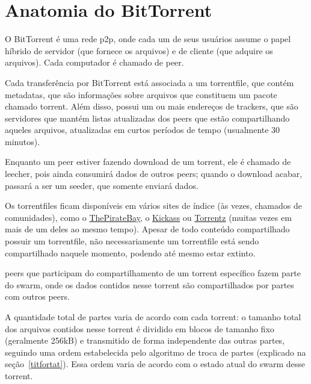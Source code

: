 
\chapter{Anatomia do BitTorrent}

O BitTorrent é uma rede \gls{p2p}, onde cada um de seus usuários assume o papel híbrido
de servidor (que fornece os arquivos) e de cliente (que adquire os arquivos). Cada
computador é chamado de \gls{peer}.

Cada transferência por BitTorrent está associada a um \gls{torrentfile}, que contém
\glspl{metadata}, que são informações sobre arquivos que constituem um pacote chamado
\gls{torrent}. Além disso, possui um ou mais endereços de \glspl{tracker}, que são
servidores que mantém listas atualizadas dos \glspl*{peer} que estão compartilhando
aqueles arquivos, atualizadas em curtos períodos de tempo (usualmente 30 minutos).

\begin{comment}
    \begin{figure}[ht!]
        \centering
        \fbox{\texttt{[image: funcionamento.png]}}
        \caption{esquema básico do funcionamento do BitTorrent}
        \label{fig:torrent-basics}
    \end{figure}
\end{comment}

Enquanto um \gls*{peer} estiver fazendo download de um \gls*{torrent}, ele é chamado de
\gls{leecher}, pois ainda consumirá dados de outros \glspl*{peer}; quando o download
acabar, passará a ser um \gls{seeder}, que somente enviará dados.

Os \glspl*{torrentfile} ficam disponíveis em vários sites de índice (às vezes, chamados
de comunidades), como o \href{http://thepiratebay.sx/}{ThePirateBay}, o
\href{http://kickass.to/}{Kickass} ou \href{https://torrentz.eu/}{Torrentz} (muitas
vezes em mais de um deles ao mesmo tempo). Apesar de todo conteúdo compartilhado possuir
um \gls*{torrentfile}, não necessariamente um \gls*{torrentfile} está sendo
compartilhado naquele momento, podendo até mesmo estar extinto.

\Glspl*{peer} que participam do compartilhamento de um \gls*{torrent} específico
fazem parte do \gls{swarm}, onde os dados contidos nesse \gls*{torrent} são
compartilhados por partes com outros \glspl*{peer}.

A quantidade total de partes varia de acordo com cada \gls*{torrent}: o tamanho total
dos arquivos contidos nesse \gls*{torrent} é dividido em blocos de tamanho fixo
(geralmente 256kB) e transmitido de forma independente das outras partes, seguindo uma
ordem estabelecida pelo algoritmo de troca de partes (explicado na seção~\ref{titfortat}).
Essa ordem varia de acordo com o estado atual do \gls*{swarm} desse \gls*{torrent}.

